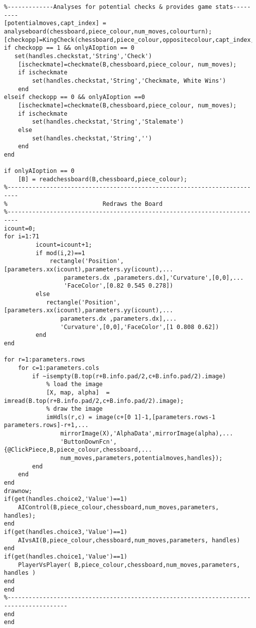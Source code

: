 \documentclass{article}
\begin{document}
\begin{lstlisting}
%-------------Analyses for potential checks & provides game stats---------
[potentialmoves,capt_index] = analyseboard(chessboard,piece_colour,num_moves,colourturn);
[checkopp]=KingCheck(chessboard,piece_colour,oppositecolour,capt_index,potentialmoves);
if checkopp == 1 && onlyAIoption == 0
   set(handles.checkstat,'String','Check')
    [ischeckmate]=checkmate(B,chessboard,piece_colour, num_moves);
    if ischeckmate
        set(handles.checkstat,'String','Checkmate, White Wins')
    end
elseif checkopp == 0 && onlyAIoption ==0
    [ischeckmate]=checkmate(B,chessboard,piece_colour, num_moves);
    if ischeckmate
        set(handles.checkstat,'String','Stalemate')
    else
        set(handles.checkstat,'String','')
    end
end

if onlyAIoption == 0
    [B] = readchessboard(B,chessboard,piece_colour);
%-------------------------------------------------------------------------
%                           Redraws the Board
%-------------------------------------------------------------------------
icount=0;
for i=1:71
         icount=icount+1;
         if mod(i,2)==1
             rectangle('Position',[parameters.xx(icount),parameters.yy(icount),...
                 parameters.dx ,parameters.dx],'Curvature',[0,0],...
                 'FaceColor',[0.82 0.545 0.278])
         else
            rectangle('Position',[parameters.xx(icount),parameters.yy(icount),...
                parameters.dx ,parameters.dx],...
                'Curvature',[0,0],'FaceColor',[1 0.808 0.62])             
         end
end

for r=1:parameters.rows
    for c=1:parameters.cols
        if ~isempty(B.top(r+B.info.pad/2,c+B.info.pad/2).image)
            % load the image
            [X, map, alpha]  = imread(B.top(r+B.info.pad/2,c+B.info.pad/2).image);
            % draw the image
            imHdls(r,c) = image(c+[0 1]-1,[parameters.rows-1 parameters.rows]-r+1,...
                mirrorImage(X),'AlphaData',mirrorImage(alpha),...
                'ButtonDownFcn',{@ClickPiece,B,piece_colour,chessboard,...
                num_moves,parameters,potentialmoves,handles});
        end
    end
end
drawnow;
if(get(handles.choice2,'Value')==1)
    AIControl(B,piece_colour,chessboard,num_moves,parameters, handles);
end
if(get(handles.choice3,'Value')==1)
    AIvsAI(B,piece_colour,chessboard,num_moves,parameters, handles)
end
if(get(handles.choice1,'Value')==1)
    PlayerVsPlayer( B,piece_colour,chessboard,num_moves,parameters, handles )
end
end
%---------------------------------------------------------------------------------------
end
end
\end{lstlisting}
\end{document}

